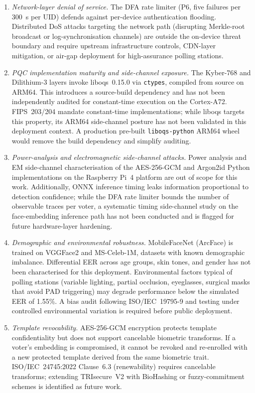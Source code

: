 \documentclass[pdflatex,sn-vancouver-num]{sn-jnl}%
\theoremstyle{thmstyleone}%
\theoremstyle{thmstyletwo}%
\theoremstyle{thmstylethree}%
\begin{document}
\begin{enumerate}
  \item \textit{Network-layer denial of service.}
    The DFA rate limiter (P6, five failures per 300~s per UID) defends
    against per-device authentication flooding. Distributed DoS attacks
    targeting the network path (disrupting Merkle-root broadcast or
    log-synchronisation channels) are outside the on-device threat boundary
    and require upstream infrastructure controls, CDN-layer mitigation,
    or air-gap deployment for high-assurance polling stations.

  \item \textit{PQC implementation maturity and side-channel exposure.}
    The Kyber-768 and Dilithium-3 layers invoke liboqs~0.15.0 via
    \texttt{ctypes}, compiled from source on ARM64. This introduces a
    source-build dependency and has not been independently audited for
    constant-time execution on the Cortex-A72. FIPS~203/204 mandate
    constant-time implementations; while liboqs targets this property,
    its ARM64 side-channel posture has not been validated in this
    deployment context. A production pre-built \texttt{liboqs-python}
    ARM64 wheel would remove the build dependency and simplify auditing.

  \item \textit{Power-analysis and electromagnetic side-channel attacks.}
    Power analysis and EM side-channel characterisation of the
    AES-256-GCM and Argon2id Python implementations on the
    Raspberry Pi~4 platform are out of scope for this work.
    Additionally, ONNX inference timing leaks information proportional
    to detection confidence; while the DFA rate limiter bounds the number
    of observable traces per voter, a systematic timing side-channel study
    on the face-embedding inference path has not been conducted and is
    flagged for future hardware-layer hardening.

  \item \textit{Demographic and environmental robustness.}
    MobileFaceNet (ArcFace) is trained on VGGFace2 and MS-Celeb-1M,
    datasets with known demographic imbalance. Differential EER across
    age groups, skin tones, and gender has not been characterised for
    this deployment. Environmental factors typical of polling stations
    (variable lighting, partial occlusion, eyeglasses, surgical masks
    that avoid PAD triggering) may degrade performance below the
    simulated EER of 1.55\%. A bias audit following ISO/IEC~19795-9
    and testing under controlled environmental variation is required
    before public deployment.

  \item \textit{Template revocability.}
    AES-256-GCM encryption protects template confidentiality but does
    not support cancelable biometric transforms. If a voter's embedding
    is compromised, it cannot be revoked and re-enrolled with a new
    protected template derived from the same biometric trait.
    ISO/IEC~24745:2022 Clause~6.3 (renewability) requires cancelable
    transforms; extending TRIsecure~V2 with BioHashing or
    fuzzy-commitment schemes is identified as future work.

\end{enumerate}
\end{document}
